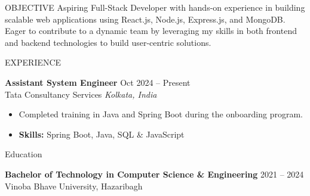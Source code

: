\documentclass{resume} %
\begin{document}
\begin{rSection}{OBJECTIVE}
Aspiring Full-Stack Developer with hands-on experience in building scalable web
applications using React.js, Node.js, Express.js, and MongoDB. Eager to contribute
to a dynamic team by leveraging my skills in both frontend and backend technologies
to build user-centric solutions.
\end{rSection}


\begin{rSection}{EXPERIENCE}

\textbf{Assistant System Engineer} \hfill Oct 2024 -- Present\\
Tata Consultancy Services \hfill \textit{Kolkata, India}
\begin{itemize}
  \itemsep -3pt
  \item Completed training in Java and Spring Boot during the onboarding program.
  \item \textbf{Skills:} {Spring Boot}, {Java}, {SQL} \& {JavaScript}
\end{itemize}

\end{rSection}


\begin{rSection}{Education}

{\bf Bachelor of Technology in Computer Science \& Engineering} \hfill {2021 -- 2024}\\
Vinoba Bhave University, Hazaribagh

\end{rSection}
\end{document}
